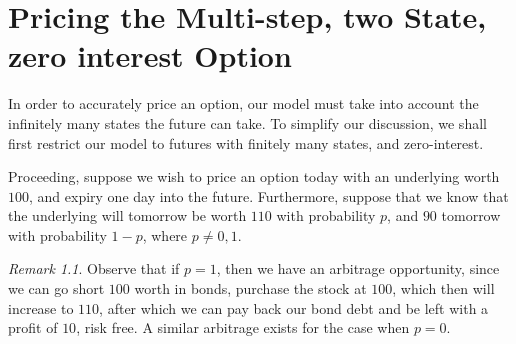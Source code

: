 \documentclass[12pt]{amsbook}
\theoremstyle{plain}
\theoremstyle{definition}
\theoremstyle{remark}
\newtheorem*{remark}{Remark}
\numberwithin{equation}{section}  %
\begin{document}

\chapter{Pricing the Multi-step, two State, zero interest Option}
In order to accurately price an option, our model must take into account the
infinitely many states the future can take. To simplify our discussion, we shall
first restrict our model to futures with finitely many states, and
zero-interest. 

Proceeding, suppose we wish to price an option today with an underlying worth
$100$, and expiry one day into the future. Furthermore, suppose that we know
that the underlying will tomorrow be worth $110$ with probability $p$, and $90$
tomorrow with probability $1-p$, where $p \neq 0,1$. 
\begin{remark}
	Observe that if $p=1$, then we have an arbitrage opportunity, since
	we can go short $100$ worth in bonds, purchase the stock at $100$, which then will increase to $110$, after which we can pay back our bond debt and be left with 
	a profit of $10$, risk free. A similar arbitrage exists for the case when $p=0$.
\end{remark}
\end{document}
